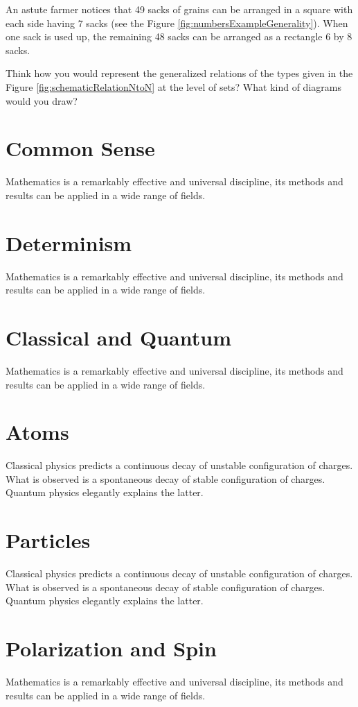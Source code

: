 An astute farmer notices that 49 sacks of grains can be arranged
in a square with each side having 7 sacks (see the Figure
\ref{fig:numbersExampleGenerality}). When one sack is used up, the
remaining 48 sacks can be arranged as a rectangle 6 by 8 sacks.


\begin{exercise}\label{exe:relationsGeneral}
Think how you would represent the generalized relations of the types
given in the Figure \ref{fig:schematicRelationNtoN} at the level of
sets? What kind of diagrams would you draw?
\end{exercise}

\section{Common Sense}
Mathematics is a remarkably effective and universal discipline, its
methods and
results can be applied in a wide range of fields.

\section{Determinism}
Mathematics is a remarkably effective and universal discipline, its
methods and
results can be applied in a wide range of fields.

\section{Classical and Quantum}
Mathematics is a remarkably effective and universal discipline, its
methods and
results can be applied in a wide range of fields.

\section{Atoms}
Classical physics predicts a continuous decay of unstable configuration of charges. What is observed is a spontaneous decay of stable configuration of charges. Quantum physics elegantly explains the latter.  

\section{Particles}
Classical physics predicts a continuous decay of unstable configuration of charges. What is observed is a spontaneous decay of stable configuration of charges. Quantum physics elegantly explains the latter.  

\section{Polarization and Spin}
Mathematics is a remarkably effective and universal discipline, its
methods and
results can be applied in a wide range of fields.

